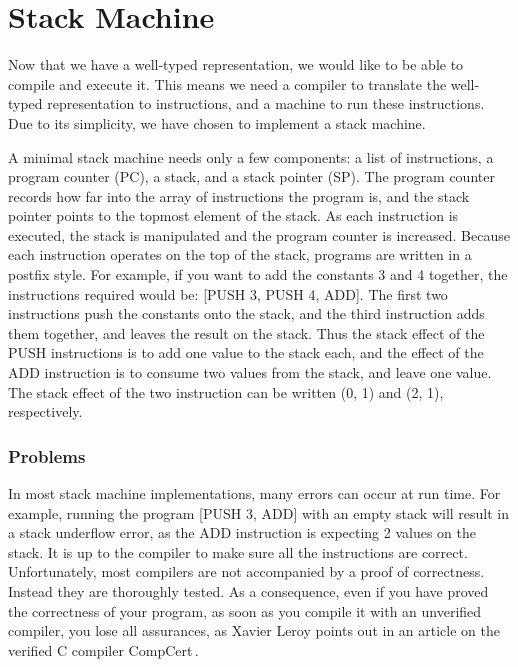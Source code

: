 \section{Stack Machine}
\label{sec:stack-machine}


Now that we have a well-typed representation, we would like to be able to compile and execute it. This means we need a compiler to translate the well-typed representation to instructions, and a machine to run these instructions. Due to its simplicity, we have chosen to implement a stack machine.

A minimal stack machine needs only a few components: a list of instructions, a program counter (PC), a stack, and a stack pointer (SP). The program counter records how far into the array of instructions the program is, and the stack pointer points to the topmost element of the stack. As each instruction is executed, the stack is manipulated and the program counter is increased. Because each instruction operates on the top of the stack, programs are written in a postfix style. For example, if you want to add the constants 3 and 4 together, the instructions required would be: [PUSH 3, PUSH 4, ADD]. The first two instructions push the constants onto the stack, and the third instruction adds them together, and leaves the result on the stack. Thus the stack effect of the PUSH instructions is to add one value to the stack each, and the effect of the ADD instruction is to consume two values from the stack, and leave one value. The stack effect of the two instruction can be written (0, 1) and (2, 1), respectively.

\subsubsection{Problems}
In most stack machine implementations, many errors can occur at run time. For example, running the program [PUSH 3, ADD] with an empty stack will result in a stack underflow error, as the ADD instruction is expecting 2 values on the stack. It is up to the compiler to make sure all the instructions are correct. Unfortunately, most compilers are not accompanied by a proof of correctness. Instead they are thoroughly tested. As a consequence, even if you have proved the correctness of your program, as soon as you compile it with an unverified compiler, you lose all assurances, as Xavier Leroy points out in an article on the verified C compiler CompCert\,\cite{Leroy_formalverification}.

